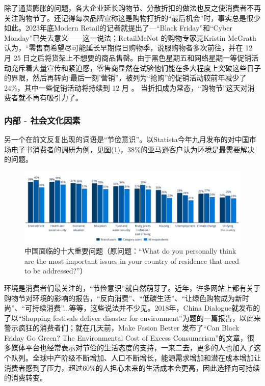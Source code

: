 \documentclass[12pt]{ctexart}
\begin{document}
除了通货膨胀的问题，各大企业延长购物节、分散折扣的做法也反之使消费者不再关注购物节了。还记得每次品牌宣称这是购物打折的“最后机会”时，事实总是很少如此。2023年底Modern Retail的记者就提出了—“Black Friday”和“Cyber Monday”已失去意义——这一说法；RetailMeNot 的购物专家克Kristin McGrath认为，“零售商希望尽可能延长早期假日购物季，说服购物者多次前往，并在 12 月 25 日之后将货架上不想要的商品售罄。由于黑色星期五和网络星期一等促销活动充斥着大量宣传和紧迫感，零售商显然在试验他们能在多大程度上突破这些日子的界限，然后再转向‘最后一刻’营销”，被列为“抢购”的促销活动较前年减少了24\%，其中一些促销活动将持续到 12 月 \cite{33}。 当折扣成为常态，“购物节”这天对消费者就不再有吸引力了。


\subsubsection{内部 - 社会文化因素}
另一个在前文反复出现的词语是“节俭意识”。以Statista今年九月发布的对中国市场电子书消费者的调研为例，见图(\ref{china})，38\%的亚马逊客户认为环境是最需要解决的问题。

\begin{figure}[htbp!]
    \centering
    \includegraphics[width=1\textwidth]{Images/19.png}
    \caption{中国面临的十大重要问题（原问题：“What do you personally think are the most important issues in your country of residence that need to be addressed?”）\cite{34}}
    \label{china}
\end{figure}

环境是消费者们最关注的，“节俭意识”就自然萌芽了。近年，许多网站上都有关于购物节对环境的影响的报告，“反向消费”、“低碳生活”、“让绿色购物成为新时尚”、“可持续消费”...等等，这些说法并不少见。2018年，China Dialogue就发布的了以“Shopping festivals deliver disaster for environment”为题的一篇报告，以此来警示疯狂的消费者们；就在几天前，Make Fasion Better 发布了“Can Black Friday Go Green? The Environmental Cost of Excess Consumerism”的文章，很多媒体平台也经常表示对节俭的生活态度的支持，一来二去，更多的人也加入了这个队列。全球中产阶级不断增加、人口不断增长，能源需求增加和潜在成本增加让消费者感到了压力，超过60\%的人担心未来的生活成本会更高，因此选择向可持续的消费转变\cite{35}。
\end{document}
